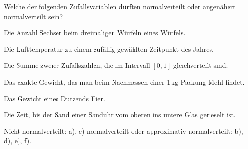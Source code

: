 Welche der folgenden Zufallsvariablen dürften normalverteilt oder angenähert
normalverteilt sein?
\begin{teilaufgaben}
\item
Die Anzahl Sechser beim dreimaligen Würfeln eines Würfels.
\item
Die Lufttemperatur zu einem zufällig gewählten Zeitpunkt des Jahres.
\item
Die Summe zweier Zufallszahlen, die im Intervall $[0,1]$ gleichverteilt
sind.
\item
Das exakte Gewicht, das man beim Nachmessen einer 1\,kg-Packung Mehl
findet.
\item
Das Gewicht eines Dutzends Eier.
\item
Die Zeit, bis der Sand einer Sanduhr vom oberen ins untere Glas gerieselt
ist.
\end{teilaufgaben}

\begin{loesung}
Nicht normalverteilt: a), c)
normalverteilt oder approximativ normalverteilt: b), d), e), f).
\end{loesung}

